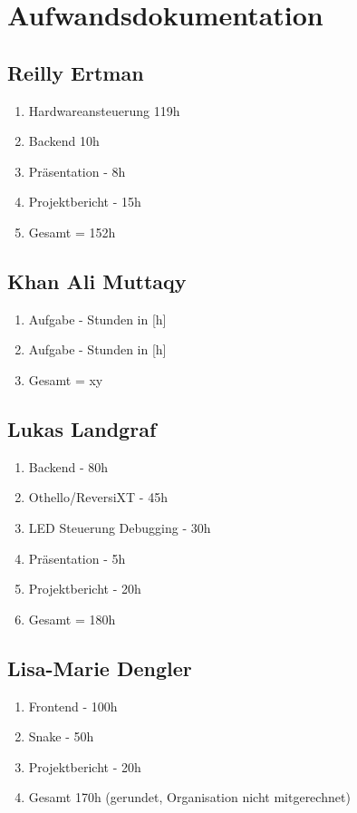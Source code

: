 \documentclass[12pt,a4paper]{article}
\begin{document}
\newpage

\section{Aufwandsdokumentation}
\subsection{Reilly Ertman}
\begin{enumerate}
\item  Hardwareansteuerung 119h
\item  Backend 10h
\item Präsentation - 8h
\item Projektbericht - 15h
\item Gesamt = 152h
\end{enumerate}
\subsection{Khan Ali Muttaqy}
\begin{enumerate}
\item Aufgabe - Stunden in [h]
\item Aufgabe - Stunden in [h]
\item Gesamt = xy
\end{enumerate}
\subsection{Lukas Landgraf}
\begin{enumerate}
\item Backend -  80h
\item Othello/ReversiXT -  45h
\item LED Steuerung Debugging - 30h
\item Präsentation - 5h
\item Projektbericht - 20h
\item Gesamt = 180h
\end{enumerate}
\subsection{Lisa-Marie Dengler}
\begin{enumerate}
\item Frontend - 100h
\item Snake - 50h
\item Projektbericht - 20h
\item Gesamt 170h (gerundet, Organisation nicht mitgerechnet)
\end{enumerate}
\newpage
\end{document}

